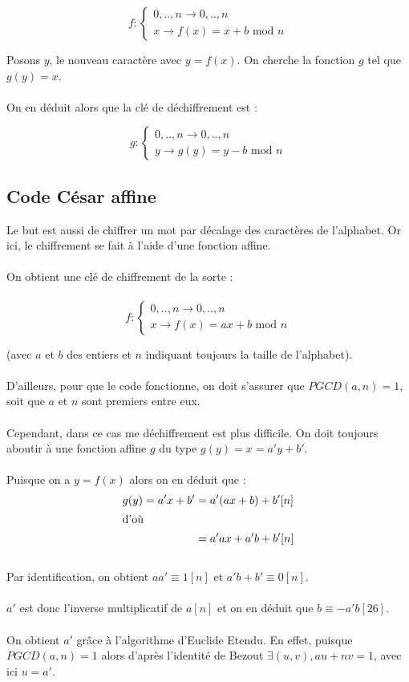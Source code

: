 \documentclass[12pt,french,titlepage]{article}
\begin{document}
	$$
	f:\left\{
	\begin{array}{l}
	{0,..,n} \rightarrow {0,..,n}\\
	x \rightarrow f(x)=x + b\text{ mod } n
	\end{array}	
	\right.
	$$
	
	\medskip
	
	Posons $y$, le nouveau caractère avec $y=f(x)$. On cherche la fonction $g$ tel que $g(y)=x$.\\
	\\
	On en déduit alors que la clé de déchiffrement est :
	
	$$
	g:\left\{
	\begin{array}{l}
	{0,..,n} \rightarrow {0,..,n}\\
	y \rightarrow g(y)=y - b\text{ mod } n
	\end{array}	
	\right.
	$$
	
	
	\subsection{Code César affine}
	
	Le but est aussi de chiffrer un mot par décalage des caractères de l'alphabet. Or ici, le chiffrement se fait à l'aide d'une fonction affine.\\
	\\
	On obtient une clé de chiffrement de la sorte :\\ 
	\\
	
	$$
	f:\left\{
	\begin{array}{l}
	{0,..,n} \rightarrow {0,..,n}\\
	x \rightarrow f(x)=ax + b\text{ mod } n
	\end{array}	
	\right.
	$$
	
	(avec $a$ et $b$ des entiers et $n$ indiquant toujours la taille de l'alphabet).\\
	\\
	D'ailleurs, pour que le code fonctionne, on doit s'assurer que $PGCD(a,n)=1$, soit que $a$ et $n$ sont premiers entre eux.\\
	\\
	Cependant, dans ce cas me déchiffrement est plus difficile. On doit toujours aboutir à une fonction affine $g$ du type $g(y) =x=a'y+b'$.\\
	\\
	Puisque on a $y=f(x)$ alors on en déduit que :
	\begin{align*}
	g(y)=a'x+b'&=a'(ax+b)+b'[n]\\
	\intertext{d'où}
	&=a'ax+a'b+b'[n]
	\end{align*} 
	\\
	Par identification, on obtient $aa'\equiv1[n]$ et $a'b+b' \equiv 0[n]$.\\
	\\
	$a'$ est donc l'inverse multiplicatif de $a[n]$ et on en déduit que $b\equiv -a'b[26]$.\\
	\\
	On obtient $a'$ grâce à l'algorithme d'Euclide Etendu. En effet, puisque $PGCD(a,n)=1$ alors d'après l'identité de Bezout $\exists(u,v), au+nv=1$, avec ici $u=a'$.
	
\end{document}
